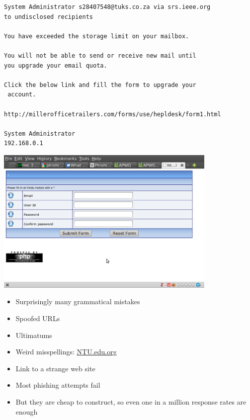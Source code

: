 \documentclass[a4paper,landscape,headrule,footrule,xetex]{foils}
\begin{document}
\MyLogo{}
\begin{verbatim}
System Administrator s28407548@tuks.co.za via srs.ieee.org 
to undisclosed recipients

You have exceeded the storage limit on your mailbox.

You will not be able to send or receive new mail until 
you upgrade your email quota.

Click the below link and fill the form to upgrade your
 account.

http://millerofficetrailers.com/forms/use/hepldesk/form1.html

System Administrator
192.168.0.1
\end{verbatim}

\begin{center}
  \includegraphics[width=0.8\textwidth]{../pics/phishing.eps}
\end{center}


\begin{itemize}
\item Surprisingly many grammatical mistakes
\item Spoofed URLs
\item Ultimatums
\item Weird misspellings: \url{NTU.edu.org}
\item Link to a strange web site
\end{itemize}
\medskip
\begin{itemize}
\item Most phishing attempts fail
\item But they are cheap to construct, so even one in a million response rates are enough
\end{itemize}
\end{document}

